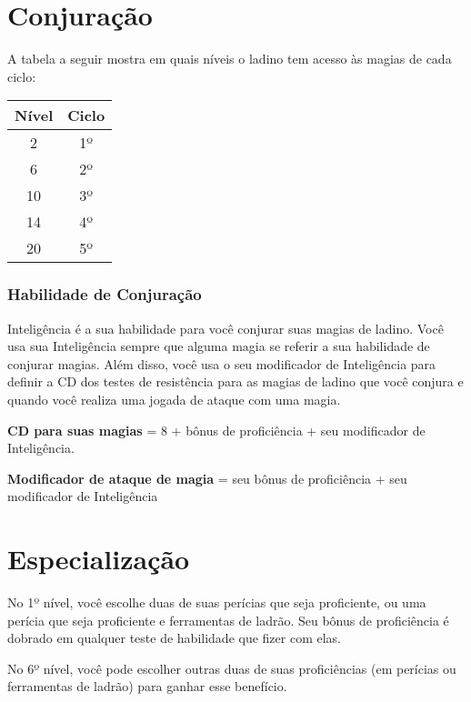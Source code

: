\documentclass{RPG_Adventure}[2021/10/20]
\begin{document}
\begin{multicols}{2}
\section*{Conjuração}%

A tabela a seguir mostra em quais níveis o ladino tem acesso às magias de cada
ciclo:

\begin{center}
\begin{tabular}{|||c||c|||}
    \hline
    \textbf{Nível} & \textbf{Ciclo} \\
    \hline
    2 & 1º \\
    \hline
    6 & 2º \\
    \hline
    10 & 3º \\
    \hline
    14 & 4º \\
    \hline
    20 & 5º \\
    \hline
\end{tabular}
\end{center}

\subsubsection*{Habilidade de Conjuração}%

Inteligência é a sua habilidade para você conjurar suas magias de ladino. Você
usa sua Inteligência sempre que alguma magia se referir a sua habilidade de
conjurar magias. Além disso, você usa o seu modificador de Inteligência para
definir a CD dos testes de resistência para as magias de ladino que você conjura
e quando você realiza uma jogada de ataque com uma magia.

\begin{center}
\textbf{CD para suas magias} = 8 + bônus de proficiência + seu modificador de
Inteligência. \nl

\textbf{Modificador de ataque de magia} = seu bônus de proficiência + seu
modificador de Inteligência
\end{center}

\section*{Especialização}%

No 1º nível, você escolhe duas de suas perícias que seja proficiente, ou uma
perícia que seja proficiente e ferramentas de ladrão. Seu bônus de proficiência
é dobrado em qualquer teste de habilidade que fizer com elas.

No 6º nível, você pode escolher outras duas de suas proficiências (em perícias
ou ferramentas de ladrão) para ganhar esse benefício.


\end{multicols}
\end{document}
